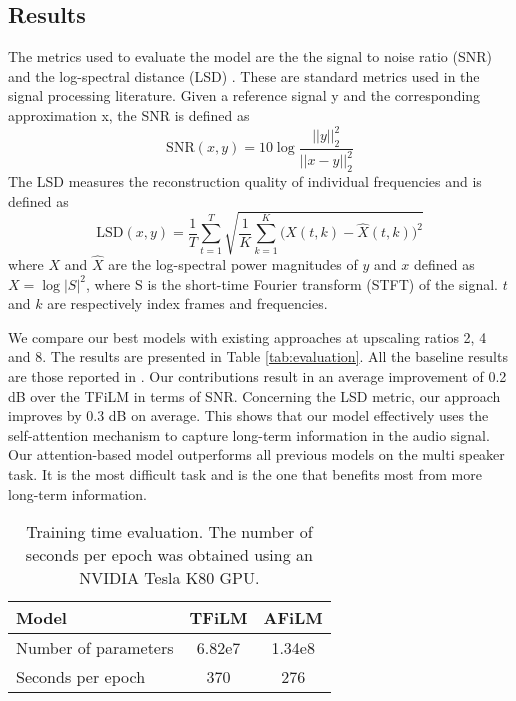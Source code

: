 \documentclass{article}
\begin{document}
\subsection{Results}
The metrics used to evaluate the model are the the signal to noise ratio (SNR) and the log-spectral distance (LSD) \cite{gray1976distance}. These are standard metrics used in the signal processing literature. Given a reference signal y and the corresponding approximation x, the SNR is
defined as
\begin{equation}
    \textrm{SNR}(x,y) = 10\log\frac{ ||y||_2^2 }{||x-y||_2^2}
\end{equation}
The LSD measures the reconstruction quality of individual
frequencies and is defined as
\begin{equation}
    \textrm{LSD}(x,y)= \frac{1}{T}\sum_{t=1}^{T} \sqrt{\frac{1}{K}\sum_{k=1}^{K} \bigg( X(t,k) - \hat{X}(t,k) \bigg)^2}
\end{equation}
where $X$ and $\hat{X}$ are the log-spectral power magnitudes of $y$ and $x$ defined as $X = \log |S|^2$, where S is the short-time Fourier transform (STFT) of the signal. $t$ and $k$ are respectively index frames and frequencies.

We compare our best models with existing approaches at upscaling ratios 2, 4 and 8. The results are presented in Table \ref{tab:evaluation}. All the baseline results are those reported in \cite{birnbaum2019temporal}. Our contributions result in an average improvement of 0.2 dB over the TFiLM in terms of SNR. Concerning the LSD metric, our approach improves by 0.3 dB on average. This shows that our model effectively uses the self-attention mechanism to capture long-term information in the audio signal. Our attention-based model outperforms all previous models on the multi speaker task. It is the most difficult task and is the one that benefits most from more long-term information.

\begin{table}[]
\centering
\caption{Training time evaluation. The number of seconds per epoch was obtained using an NVIDIA Tesla K80 GPU.}
\label{tab:computational_per}
\begin{tabular}{|l|c|c|}
\hline
Model                & TFiLM  & AFiLM  \\ \hline
Number of parameters & 6.82e7 & 1.34e8 \\ \hline
Seconds per epoch    & 370    & 276    \\ \hline
\end{tabular}
\end{table}
\end{document}
